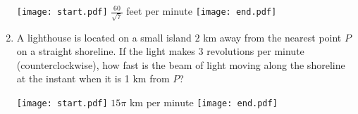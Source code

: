 \documentclass[12pt]{article}
\begin{document}
\begin{enumerate}
\texttt{[image: start.pdf]}
{{$\frac{60}{\sqrt{7}}$ feet per minute}}
\texttt{[image: end.pdf]}


\item A lighthouse is located on a small island $2$ km away from the nearest point $P$ on a straight shoreline.  If the light makes 3 revolutions per minute (counterclockwise), how fast is the beam of light moving along the shoreline at the instant when it is 1 km from $P$?

\texttt{[image: start.pdf]}
{{$15\pi$ km per minute}}
\texttt{[image: end.pdf]}


\end{enumerate}
\end{document}
